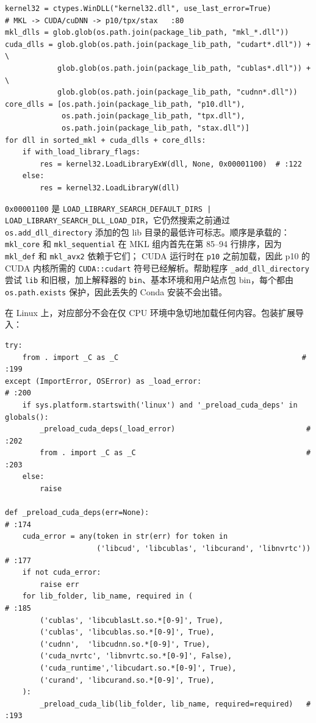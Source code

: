 \begin{lstlisting}[caption={ordered DLL preload on Windows.}, label=lst:winpreload]
kernel32 = ctypes.WinDLL("kernel32.dll", use_last_error=True)
# MKL -> CUDA/cuDNN -> p10/tpx/stax   :80
mkl_dlls = glob.glob(os.path.join(package_lib_path, "mkl_*.dll"))
cuda_dlls = glob.glob(os.path.join(package_lib_path, "cudart*.dll")) + \
            glob.glob(os.path.join(package_lib_path, "cublas*.dll")) + \
            glob.glob(os.path.join(package_lib_path, "cudnn*.dll"))
core_dlls = [os.path.join(package_lib_path, "p10.dll"),
             os.path.join(package_lib_path, "tpx.dll"),
             os.path.join(package_lib_path, "stax.dll")]
for dll in sorted_mkl + cuda_dlls + core_dlls:
    if with_load_library_flags:
        res = kernel32.LoadLibraryExW(dll, None, 0x00001100)  # :122
    else:
        res = kernel32.LoadLibraryW(dll)
\end{lstlisting}

\texttt{0x00001100} 是 \texttt{LOAD\_LIBRARY\_SEARCH\_DEFAULT\_DIRS | LOAD\_LIBRARY\_SEARCH\_DLL\_LOAD\_DIR}，它仍然搜索之前通过 \texttt{os.add\_dll\_directory} 添加的包 lib 目录的最低许可标志。顺序是承载的：\texttt{mkl\_core} 和 \texttt{mkl\_sequential} 在 MKL 组内首先在第 85--94 行排序，因为 \texttt{mkl\_def} 和 \texttt{mkl\_avx2} 依赖于它们； CUDA 运行时在 \texttt{p10} 之前加载，因此 p10 的 CUDA 内核所需的 \texttt{CUDA::cudart} 符号已经解析。帮助程序 \texttt{\_add\_dll\_directory} 尝试 \texttt{lib} 和旧根，加上解释器的 \texttt{bin}、基本环境和用户站点包 bin，每个都由 \texttt{os.path.exists} 保护，因此丢失的 Conda 安装不会出错。

在 Linux 上，对应部分不会在仅 CPU 环境中急切地加载任何内容。包装扩展导入：

\begin{lstlisting}[caption={Linux CUDA wheel probing.}, label=lst:linuxpreload]
try:
    from . import _C as _C                                          # :199
except (ImportError, OSError) as _load_error:                         # :200
    if sys.platform.startswith('linux') and '_preload_cuda_deps' in globals():
        _preload_cuda_deps(_load_error)                              # :202
        from . import _C as _C                                       # :203
    else:
        raise

def _preload_cuda_deps(err=None):                                     # :174
    cuda_error = any(token in str(err) for token in
                     ('libcud', 'libcublas', 'libcurand', 'libnvrtc'))  # :177
    if not cuda_error:
        raise err
    for lib_folder, lib_name, required in (                           # :185
        ('cublas', 'libcublasLt.so.*[0-9]', True),
        ('cublas', 'libcublas.so.*[0-9]', True),
        ('cudnn',  'libcudnn.so.*[0-9]', True),
        ('cuda_nvrtc', 'libnvrtc.so.*[0-9]', False),
        ('cuda_runtime','libcudart.so.*[0-9]', True),
        ('curand', 'libcurand.so.*[0-9]', True),
    ):
        _preload_cuda_lib(lib_folder, lib_name, required=required)   # :193
\end{lstlisting}

